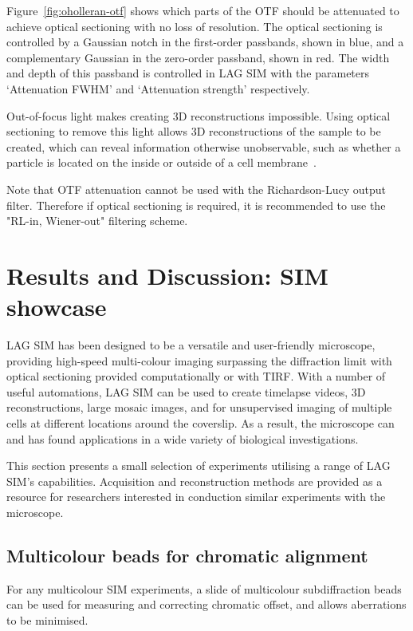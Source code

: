 Figure~\ref{fig:oholleran-otf} shows which parts of the OTF should be attenuated to achieve optical sectioning with no loss of resolution. 
The optical sectioning is controlled by a Gaussian notch in the first-order passbands, shown in blue, and a complementary Gaussian in the zero-order passband, shown in red. 
The width and depth of this passband is controlled in LAG SIM with the parameters `Attenuation FWHM' and `Attenuation strength' respectively.


Out-of-focus light makes creating 3D reconstructions impossible. %
Using optical sectioning to remove this light allows 3D reconstructions of the sample to be created, which can reveal information otherwise unobservable, such as whether a particle is located on the inside or outside of a cell membrane~\cite{teplensky2017temperature}. 

Note that OTF attenuation cannot be used with the Richardson-Lucy output filter. 
Therefore if optical sectioning is required, it is recommended to use the "RL-in, Wiener-out" filtering scheme. 


\section{Results and Discussion: SIM showcase} \label{sec:sim-showcase}
LAG SIM has been designed to be a versatile and user-friendly microscope, providing high-speed multi-colour imaging surpassing the diffraction limit with optical sectioning provided computationally or with TIRF. 
With a number of useful automations, LAG SIM can be used to create timelapse videos, 3D reconstructions, large mosaic images, and for unsupervised imaging of multiple cells at different locations around the coverslip. 
As a result, the microscope can and has found applications in a wide variety of biological investigations.

This section presents a small selection of experiments utilising a range of LAG SIM's capabilities. 
Acquisition and reconstruction methods are provided as a resource for researchers interested in conduction similar experiments with the microscope. 

\subsection{Multicolour beads for chromatic alignment}
For any multicolour SIM experiments, a slide of multicolour subdiffraction beads can be used for measuring and correcting chromatic offset, and allows aberrations to be minimised. 

